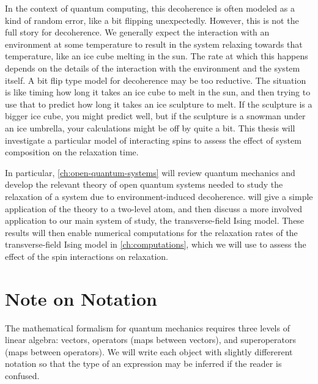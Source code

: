 In the context of quantum computing, this decoherence is often modeled as a kind
of random error, like a bit flipping unexpectedly. However, this is not the full
story for decoherence. We generally expect the interaction with an environment
at some temperature to result in the system relaxing towards that temperature,
like an ice cube melting in the sun. The rate at which this happens depends on
the details of the interaction with the environment and the system itself. A bit
flip type model for decoherence may be too reductive. The situation is like
timing how long it takes an ice cube to melt in the sun, and then trying to use
that to predict how long it takes an ice sculpture to melt. If the sculpture is
a bigger ice cube, you might predict well, but if the sculpture is a snowman
under an ice umbrella, your calculations might be off by quite a bit. This
thesis will investigate a particular model of interacting spins to assess the
effect of system composition on the relaxation time.

In particular, \cref{ch:open-quantum-systems} will review quantum mechanics and
develop the relevant theory of open quantum systems needed to study the
relaxation of a system due to environment-induced decoherence. 
will give a simple application of the theory to a two-level atom, and then
discuss a more involved application to our main system of study, the
transverse-field Ising model. These results will then enable numerical
computations for the relaxation rates of the transverse-field Ising model in
\cref{ch:computations}, which we will use to assess the effect of the spin
interactions on relaxation.


\chapter*{Note on Notation}

The mathematical formalism for quantum mechanics requires three levels of linear
algebra: vectors, operators (maps between vectors), and superoperators (maps
between operators). We will write each object with slightly differerent notation
so that the type of an expression may be inferred if the reader is confused.

